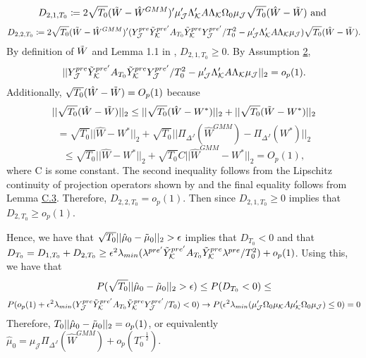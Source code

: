 \documentclass{article}
\begin{document}
\begin{equation*}
    D_{2,1,T_0} \coloneqq 2 \sqrt{T_0}(\Tilde{W} - \hat{W}^{GMM})' \mu_{\mathcal{J}}' \Lambda_{\mathcal{K}}' A \Lambda_{\mathcal{K}} \Omega_0 \mu_{\mathcal{J}} \sqrt{T_0} (\hat{W} - \Tilde{W}) \text{ and }
\end{equation*}
\begin{equation*}
    D_{2,2,T_0} \coloneqq 2 \sqrt{T_0}(\Tilde{W} - \hat{W}^{GMM})'(Y_{\mathcal{J}}^{pre} \Tilde{Y}_{\mathcal{K}}^{pre'} A_{T_{0}} \Tilde{Y}_{\mathcal{K}}^{pre} Y_{\mathcal{J}}^{pre'}/T_0^2 - \mu_{\mathcal{J}}' \Lambda_{\mathcal{K}}' A \Lambda_{\mathcal{K}} \mu_{\mathcal{J}}) \sqrt{T_0} (\hat{W} - \Tilde{W}).
\end{equation*}
By definition of $\Tilde{W}$ and Lemma 1.1 in \cite{Zarantonello1971}, $D_{2,1,T_0} \geq 0$. By Assumption \hyperref[A2]{2}, 
$$||Y_{\mathcal{J}}^{pre} \Tilde{Y}_{\mathcal{K}}^{pre'} A_{T_{0}} \Tilde{Y}_{\mathcal{K}}^{pre} Y_{\mathcal{J}}^{pre'}/T_0^2 - \mu_{\mathcal{J}}' \Lambda_{\mathcal{K}}' A \Lambda_{\mathcal{K}} \mu_{\mathcal{J}}||_2 = o_p(1).$$ Additionally, $\sqrt{T_0}(\hat{W} - \Tilde{W}) = O_p(1)$ because
\begin{equation*}
    ||\sqrt{T_0}(\hat{W} - \Tilde{W})||_2 \leq ||\sqrt{T_0}(\hat{W} - W^*)||_2 + ||\sqrt{T_0}(\Tilde{W} - W^*)||_2
\end{equation*}
\begin{equation*}
    =\sqrt{T_0}||\hat{W} - W^*||_2 + \sqrt{T_0}||\Pi_{\Delta^J} (\hat{W}^{GMM})-\Pi_{\Delta^J}(W^*)||_2
\end{equation*}
\begin{equation*}
    \leq \sqrt{T_0}||\hat{W} - W^*||_2 + \sqrt{T_0}C||\hat{W}^{GMM} - W^*||_2 = O_p(1),
\end{equation*}
where C is some constant. The second inequality follows from the Lipschitz continuity of projection operators shown by \cite{Zarantonello1971} and the final equality follows from Lemma \hyperref[LC3]{C.3}. Therefore, $D_{2,2,T_0} = o_p(1)$. Then since $D_{2,1,T_0} \geq 0$ implies that $D_{2,T_0} \geq o_p(1)$.
\par  
Hence, we have that $\sqrt{T_0}||\hat{\mu}_0 - \Tilde{\mu}_0||_2 > \epsilon$ implies that $D_{T_0} < 0$ and that $D_{T_0} = D_{1,T_0} + D_{2,T_0} \geq \epsilon^2 \lambda_{min}( \lambda^{pre'} \Tilde{Y}_{\mathcal{K}}^{pre'} A_{T_{0}} \Tilde{Y}_{\mathcal{K}}^{pre} \lambda^{pre}/T_0^2) + o_p(1)$. Using this, we have that
\begin{equation*}
    P(\sqrt{T_0}||\hat{\mu}_0 - \Tilde{\mu}_0||_2 > \epsilon) \leq P(D_{T_0} < 0) \leq 
\end{equation*}
\begin{equation*}
    P(o_p(1) + \epsilon^2 \lambda_{min}( Y_{\mathcal{J}}^{pre} \Tilde{Y}_{\mathcal{K}}^{pre'} A_{T_{0}} \Tilde{Y}_{\mathcal{K}}^{pre} Y_{\mathcal{J}}^{pre'}/T_0) < 0) \rightarrow P(\epsilon^2 \lambda_{min}(\mu_{\mathcal{J}}' \Omega_0 \mu_{\mathcal{K}} A \mu_{\mathcal{K}}' \Omega_0 \mu_{\mathcal{J}}) \leq 0) = 0
\end{equation*}
Therefore, $T_0||\hat{\mu}_0 - \Tilde{\mu}_0||_2 = o_p(1)$, or equivalently $\hat{\mu}_0 = \mu_{\mathcal{J}}\Pi_{\Delta^J}(\hat{W}^{GMM}) + o_p(T_0^{-\frac{1}{2}})$.
\end{document}
